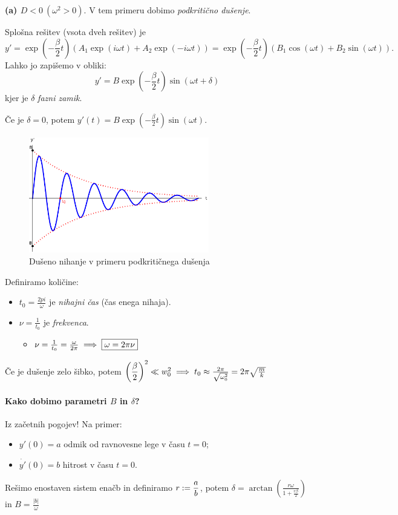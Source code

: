 \textbf{(a) \(D < 0 \ (\omega^2 > 0)\)}. V tem primeru dobimo \emph{podkritično dušenje}.

Splošna rešitev (vsota dveh rešitev) je 
\[
    y' = \exp\left(-\frac{\beta}{2}t\right) (A_1 \exp(i\omega t) + A_2 \exp(-i\omega t)) = \exp\left(-\frac{\beta}{2}t\right)(B_1 \cos(\omega t) + B_2 \sin(\omega t)).
\]
Lahko jo zapišemo v obliki:
\[
    \boxed{y' = B \exp\left(-\frac{\beta}{2}t\right) \sin (\omega t + \delta)}
\]
kjer je \(\delta\) \emph{fazni zamik}.

\begin{primer}
    Če je \(\delta = 0\), potem \(y'(t) = B \exp (-\frac{\beta}{2} t) \sin (\omega t)\).
    \begin{figure}[h!]
        \centering
        \includegraphics[width=0.7\textwidth]{img/01_002.pdf}
        \caption{Dušeno nihanje v primeru podkritičnega dušenja}      
    \end{figure}
    
    Definiramo količine:
    \begin{itemize}
        \item \(t_0 = \frac{2pi}{\omega}\) je \emph{nihajni čas} (čas enega nihaja).
        \item \(\nu = \frac{1}{t_0}\) je \emph{frekvenca}.
        \begin{itemize}
            \item \(\nu = \frac{1}{t_0} = \frac{\omega}{2 \pi} \implies \boxed{\omega = 2 \pi \nu}\)
        \end{itemize}
    \end{itemize}

    Če je dušenje zelo šibko, potem \(\left(\displaystyle \frac{\beta}{2}\right)^2 \ll w_0^2 \implies t_0 \approx \frac{2 \pi}{\sqrt{\omega_0^2}} = 2 \pi \sqrt{\frac{m}{k}}\)
\end{primer}

\paragraph{Kako dobimo parametri \(B\) in \(\delta\)?} Iz začetnih pogojev! Na primer:
\begin{itemize}
    \item \(y'(0) = a\) odmik od ravnovesne lege v času \(t = 0\);
    \item \(\dot{y'}(0) = b\) hitrost v času \(t = 0\).
\end{itemize}
Rešimo enostaven sistem enačb in definiramo \(\displaystyle r:= \frac{a}{b}\), potem \(\boxed{\delta = \arctan \left(\frac{r \omega}{1+\frac{r\beta}{2}}\right)}\) in \(\boxed{B = \frac{|b|}{\omega}}\)


